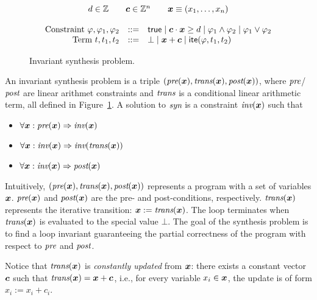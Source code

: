 \documentclass[runningheads]{llncs}
\begin{document}
\begin{figure}
  \begin{displaymath}
    \begin{array}{rcl}
      \multicolumn{3}{c}{d \in \mathbb{Z} \qquad \vecc \in \mathbb{Z}^n \qquad \vecx \equiv (x_1, \dots, x_n)}
      \\
      \\
      \textrm{Constraint}~ \varphi,\varphi_1,\varphi_2 & ::= & \true
      		\mid  \vecc \cdot \vecx \geq d
      		\mid \varphi_1 \wedge \varphi_2
		\mid \varphi_1 \vee \varphi_2
      \\
      \textrm{Term}~ t,t_1,t_2 & ::= & \bot
      		\mid \vecx + \vec{c}
      		\mid \ite(\varphi, t_1, t_2)
    \end{array}
  \end{displaymath}
  \caption{Invariant synthesis problem.}
  \label{fig:invariant-synthesis-problem}
\end{figure}

\begin{definition}
An invariant synthesis problem is a triple $(\pre(\vecx),\trans(\vecx),\post(\vecx))$, where $\textit{pre}$/$\textit{post}$ are linear arithmet constraints and $\textit{trans}$ is a conditional linear arithmetic term, all defined in Figure~\ref{fig:invariant-synthesis-problem}. A solution to $\textit{syn}$ is a constraint $\inv(\vecx)$ such that
\begin{itemize}
\item $\forall \vecx: \pre(\vecx) \Rightarrow \inv(\vecx)$
\item $\forall \vecx: \inv(\vecx) \Rightarrow \inv(\trans(\vecx))$
\item $\forall \vecx: \inv(\vecx) \Rightarrow \post(\vecx)$
\end{itemize}
\end{definition}

Intuitively, $(\pre(\vecx),\trans(\vecx),\post(\vecx))$ represents a program with a set of variables $\vecx$. $\pre(\vecx)$ and $\post(\vecx)$ are the pre- and post-conditions, respectively. $\trans(\vecx)$ represents the iterative transition: $\vecx := \trans(\vecx)$. The loop terminates when $\trans(\vecx)$ is evaluated to the special value $\bot$. The goal of the synthesis problem is to find a loop invariant guaranteeing the partial correctness of the program with respect to $\textit{pre}$ and $\textit{post}$.

Notice that $\trans(\vecx)$ is \emph{constantly updated} from $\vecx$: there exists a constant vector $\vecc$ such that $\trans(\vecx) = \vecx + \vecc$, i.e., for every variable $x_i \in \vecx$, the update is of form $x_i := x_i + c_i$.
\end{document}
